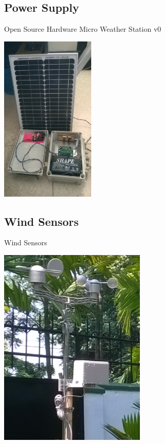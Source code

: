 \documentclass[xcolor=dvipsnames,beamer]{beamer} %
\begin{document}
\subsection{Power Supply}
\begin{frame}[fragile]{Open Source Hardware Micro Weather Station v0}

\begin{center}
\includegraphics[width=4.5cm]{MWSv1_power}
\end{center}
\end{frame}

\subsection{Wind Sensors}
\begin{frame}[fragile]{Wind Sensors}

\begin{center}
 \includegraphics[width=7cm]{MWSv1_sensors}
\end{center}

\end{frame}
\end{document}

